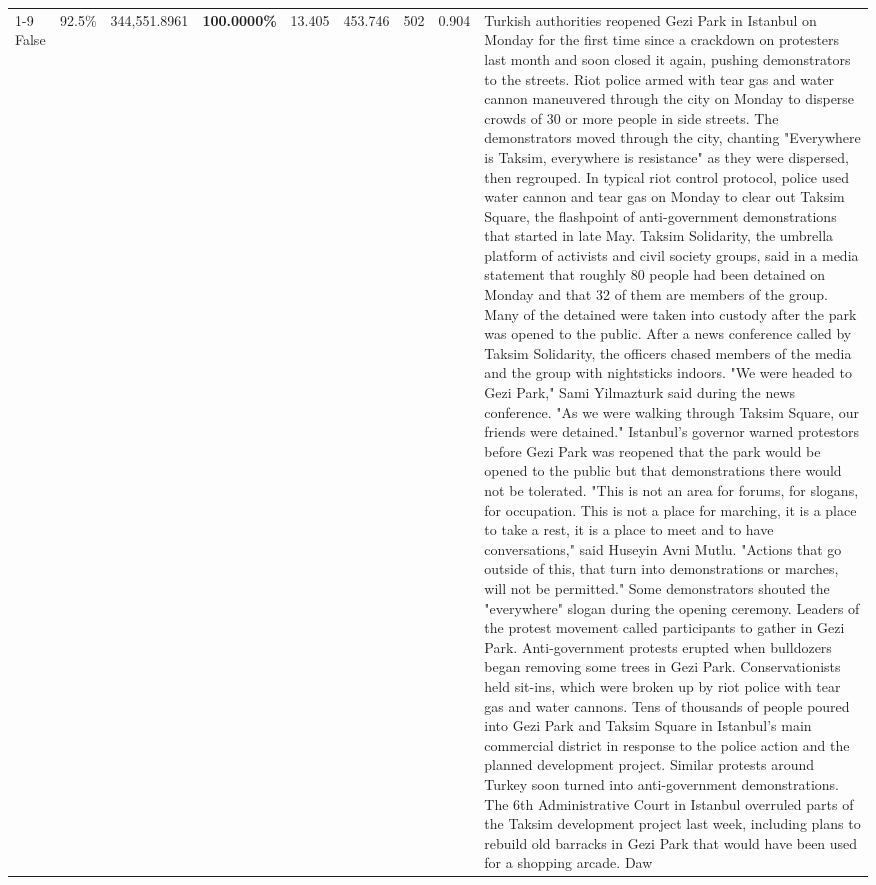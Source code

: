 \begin{table}[H]
\begin{tabular}{lllrlllll}
\cline{1-9}
False & 92.5\% & 344,551.8961 & \bfseries \color{red} 100.0000\% & 13.405 & 453.746 & 502 & 0.904 & Turkish authorities reopened Gezi Park in Istanbul on Monday for the first time since a crackdown on protesters last month and soon closed it again, pushing demonstrators to the streets. Riot police armed with tear gas and water cannon maneuvered through the city on Monday to disperse crowds of 30 or more people in side streets. The demonstrators moved through the city, chanting "Everywhere is Taksim, everywhere is resistance" as they were dispersed, then regrouped. In typical riot control protocol, police used water cannon and tear gas on Monday to clear out Taksim Square, the flashpoint of anti-government demonstrations that started in late May. Taksim Solidarity, the umbrella platform of activists and civil society groups, said in a media statement that roughly 80 people had been detained on Monday and that 32 of them are members of the group. Many of the detained were taken into custody after the park was opened to the public. After a news conference called by Taksim Solidarity, the officers chased members of the media and the group with nightsticks indoors. "We were headed to Gezi Park," Sami Yilmazturk said during the news conference. "As we were walking through Taksim Square, our friends were detained." Istanbul's governor warned protestors before Gezi Park was reopened that the park would be opened to the public but that demonstrations there would not be tolerated. "This is not an area for forums, for slogans, for occupation. This is not a place for marching, it is a place to take a rest, it is a place to meet and to have conversations," said Huseyin Avni Mutlu. "Actions that go outside of this, that turn into demonstrations or marches, will not be permitted." Some demonstrators shouted the "everywhere" slogan during the opening ceremony. Leaders of the protest movement called participants to gather in Gezi Park. Anti-government protests erupted when bulldozers began removing some trees in Gezi Park. Conservationists held sit-ins, which were broken up by riot police with tear gas and water cannons. Tens of thousands of people poured into Gezi Park and Taksim Square in Istanbul's main commercial district in response to the police action and the planned development project. Similar protests around Turkey soon turned into anti-government demonstrations. The 6th Administrative Court in Istanbul overruled parts of the Taksim development project last week, including plans to rebuild old barracks in Gezi Park that would have been used for a shopping arcade. Daw \\

\end{tabular}
\end{table}
